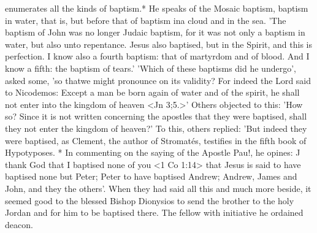 enumerates all the kinds of baptism.* He speaks of the Mosaic
baptism, baptism in water, that is, but before that of baptism ina
cloud and in the sea.
'The baptism of John was no longer Judaic
baptism, for it was not only a baptism in water, but also unto
repentance.
Jesus also baptised, but in the Spirit, and this is
perfection.
I know also a fourth baptism: that of martyrdom and of
blood.
And I know a fifth: the baptism of tears.' 'Which of these
baptisms did he undergo', asked some, 'so that\textquotesingle we might pronounce
on its validity? For indeed the Lord said to Nicodemos: Except a
man be born again of water and of the spirit, he shall not enter into
the kingdom of heaven <Jn 3;5.>' Others objected to this: 'How so?
Since it is not written concerning the apostles that they were
baptised, shall they not enter the kingdom of heaven?' To this,
others replied: 'But indeed they were baptised, as Clement, the
author of Stromatés, testifies in the fifth book of Hypotyposes.
* In
commenting on the saying of the Apostle Pau!, he opines: J thank
God that I baptised none of you <1 Co 1:14> that Jesus is said to
have baptised none but Peter; Peter to have baptised Andrew;
Andrew, James and John, and they the others'.
When they had said
all this and much more beside, it seemed good to the blessed Bishop
Dionysios to send the brother to the holy Jordan and for him to be
baptised there.
The fellow with initiative he ordained deacon.

